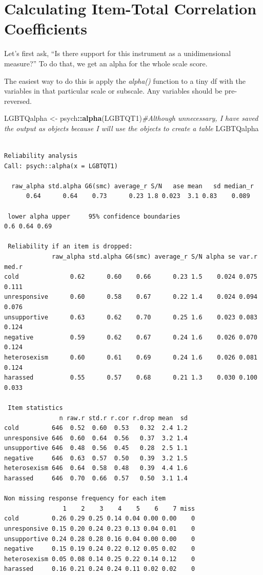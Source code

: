 \documentclass[
  english,
]{book}
\newenvironment{Shaded}{\begin{snugshade}}{\end{snugshade}}
\newcommand{\CommentTok}[1]{\textcolor[rgb]{0.56,0.35,0.01}{\textit{#1}}}
\newcommand{\KeywordTok}[1]{\textcolor[rgb]{0.13,0.29,0.53}{\textbf{#1}}}
\newcommand{\NormalTok}[1]{#1}
\newcommand{\OperatorTok}[1]{\textcolor[rgb]{0.81,0.36,0.00}{\textbf{#1}}}
\newcommand{\StringTok}[1]{\textcolor[rgb]{0.31,0.60,0.02}{#1}}
\begin{document}
\hypertarget{calculating-item-total-correlation-coefficients}{%
\section{Calculating Item-Total Correlation Coefficients}\label{calculating-item-total-correlation-coefficients}}

Let's first ask, ``Is there support for this instrument as a unidimensional measure?'' To do that, we get an alpha for the whole scale score.

The easiest way to do this is apply the \emph{alpha()} function to a tiny df with the variables in that particular scale or subscale. Any variables should be pre-reversed.

\begin{Shaded}
\begin{Highlighting}[]
\NormalTok{LGBTQalpha <-}\StringTok{ }\NormalTok{psych}\OperatorTok{::}\KeywordTok{alpha}\NormalTok{(LGBTQT1)}\CommentTok{#Although unnecessary, I have saved the output as objects because I will use the objects to create a table }
\NormalTok{LGBTQalpha}
\end{Highlighting}
\end{Shaded}

\begin{verbatim}

Reliability analysis   
Call: psych::alpha(x = LGBTQT1)

  raw_alpha std.alpha G6(smc) average_r S/N   ase mean   sd median_r
      0.64      0.64    0.73      0.23 1.8 0.023  3.1 0.83    0.089

 lower alpha upper     95% confidence boundaries
0.6 0.64 0.69 

 Reliability if an item is dropped:
             raw_alpha std.alpha G6(smc) average_r S/N alpha se var.r med.r
cold              0.62      0.60    0.66      0.23 1.5    0.024 0.075 0.111
unresponsive      0.60      0.58    0.67      0.22 1.4    0.024 0.094 0.076
unsupportive      0.63      0.62    0.70      0.25 1.6    0.023 0.083 0.124
negative          0.59      0.62    0.67      0.24 1.6    0.026 0.070 0.124
heterosexism      0.60      0.61    0.69      0.24 1.6    0.026 0.081 0.124
harassed          0.55      0.57    0.68      0.21 1.3    0.030 0.100 0.033

 Item statistics 
               n raw.r std.r r.cor r.drop mean  sd
cold         646  0.52  0.60  0.53   0.32  2.4 1.2
unresponsive 646  0.60  0.64  0.56   0.37  3.2 1.4
unsupportive 646  0.48  0.56  0.45   0.28  2.5 1.1
negative     646  0.63  0.57  0.50   0.39  3.2 1.5
heterosexism 646  0.64  0.58  0.48   0.39  4.4 1.6
harassed     646  0.70  0.66  0.57   0.50  3.1 1.4

Non missing response frequency for each item
                1    2    3    4    5    6    7 miss
cold         0.26 0.29 0.25 0.14 0.04 0.00 0.00    0
unresponsive 0.15 0.20 0.24 0.23 0.13 0.04 0.01    0
unsupportive 0.24 0.28 0.28 0.16 0.04 0.00 0.00    0
negative     0.15 0.19 0.24 0.22 0.12 0.05 0.02    0
heterosexism 0.05 0.08 0.14 0.25 0.22 0.14 0.12    0
harassed     0.16 0.21 0.24 0.24 0.11 0.02 0.02    0
\end{verbatim}
\end{document}
